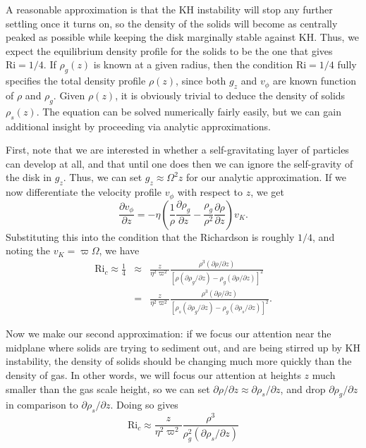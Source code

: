 A reasonable approximation is that the KH instability will stop any further settling once it turns on, so the density of the solids will become as centrally peaked as possible while keeping the disk marginally stable against KH. Thus, we expect the equilibrium density profile for the solids to be the one that gives $\mbox{Ri}=1/4$. If $\rho_g(z)$ is known at a given radius, then the condition $\mbox{Ri} =1/4$ fully specifies the total density profile $\rho(z)$, since both $g_z$ and $v_\phi$ are known function of $\rho$ and $\rho_g$. Given $\rho(z)$, it is obviously trivial to deduce the density of solids $\rho_s(z)$. The equation can be solved numerically fairly easily, but we can gain additional insight by proceeding via analytic approximations.

First, note that we are interested in whether a self-gravitating layer of particles can develop at all, and that until one does then we can ignore the self-gravity of the disk in $g_z$. Thus, we can set $g_z\approx \Omega^2 z$ for our analytic approximation. If we now differentiate the velocity profile $v_{\phi}$ with respect to $z$, we get
\begin{equation}
\frac{\partial v_\phi}{\partial z} = -\eta \left(\frac{1}{\rho} \frac{\partial \rho_g}{\partial z} - \frac{\rho_g}{\rho^2}\frac{\partial \rho}{\partial z}\right) v_K.
\end{equation}
Substituting this into the condition that the Richardson is roughly $1/4$, and noting the $v_K = \varpi\Omega$, we have
\begin{eqnarray}
\mbox{Ri}_c \approx \frac{1}{4} 
& \approx &
\frac{z}{\eta^2 \varpi^2} \frac{\rho^3 (\partial \rho/\partial z)}{\left[\rho (\partial \rho_g/\partial z) - \rho_g (\partial \rho/\partial z)\right]^2} \\
& = &
\frac{z}{\eta^2 \varpi^2} \frac{\rho^3 (\partial \rho/\partial z)}{\left[\rho_s (\partial \rho_g/ \partial z) - \rho_g (\partial \rho_s/\partial z)\right]^2}.
\end{eqnarray}

Now we make our second approximation: if we focus our attention near the midplane where solids are trying to sediment out, and are being stirred up by KH instability, the density of solids should be changing much more quickly than the density of gas. In other words, we will focus our attention at heights $z$ much smaller than the gas scale height, so we can set $\partial \rho/\partial z \approx \partial \rho_s/\partial z$, and drop $\partial \rho_g/\partial z$ in comparison to $\partial \rho_s/\partial z$. Doing so gives
\begin{equation}
\mbox{Ri}_c \approx \frac{z}{\eta^2 \varpi^2} \frac{\rho^3}{\rho_g^2 (\partial\rho_s/\partial z)}
\end{equation}

